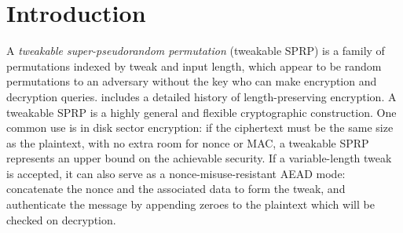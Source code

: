 \documentclass[hctr2.tex]{subfiles}
\begin{document}
\section{Introduction}

A \emph{tweakable super-pseudorandom permutation} (tweakable SPRP) is
a family of permutations indexed by tweak and input length, which
appear to be random permutations to an adversary without the key who
can make encryption and decryption queries\cite{cmc}. \cite{adiantum}
includes a detailed history of length-preserving encryption. A
tweakable SPRP is a highly general and flexible cryptographic
construction. One common use is in disk sector encryption: if the
ciphertext must be the same size as the plaintext, with no extra room
for nonce or MAC, a tweakable SPRP represents an upper bound on the
achievable security. If a variable-length tweak is accepted, it can
also serve as a nonce-misuse-resistant AEAD mode: concatenate the
nonce and the associated data to form the tweak, and authenticate the
message by appending zeroes to the plaintext which will be checked on
decryption\cite{encodethenencrypt, aez}.
\end{document}
